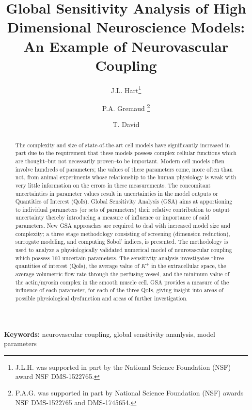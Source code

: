 \documentclass[smallextended]{svjour3}
\numberwithin{equation}{section}
\begin{document}
\title{Global Sensitivity Analysis of High Dimensional Neuroscience Models: An Example of Neurovascular Coupling}
\author{ J.L. Hart\thanks{J.L.H. was supported in part by the National Science Foundation (NSF) award NSF DMS-1522765.} \and P.A. Gremaud  \thanks{P.A.G. was supported in part by National Science Foundation (NSF) awards NSF DMS-1522765 and DMS-1745654.}\and T. David}
\maketitle
\thispagestyle{empty}

\begin{abstract}
The complexity and size of state-of-the-art cell models have significantly increased in part due to  the requirement that these models possess complex cellular functions which are thought--but not necessarily proven--to be important. Modern cell models often involve hundreds of parameters; the values of these parameters come, more often than not, from animal experiments whose relationship to the human physiology is weak with very little information on the errors in these measurements. The concomitant uncertainties in parameter values result in uncertainties in the model outputs or Quantities of Interest (QoIs). Global Sensitivity Analysis (GSA) aims at apportioning to individual parameters (or sets of parameters) their relative contribution to output uncertainty thereby introducing a measure of influence or importance of said parameters. New GSA approaches are required to deal with increased model size and complexity; a three stage methodology consisting of screening (dimension reduction), surrogate modeling, and computing Sobol' indices, is presented. The methodology is used to analyze a physiologically validated numerical model of neurovascular coupling which possess 160 uncertain parameters. The sensitivity analysis investigates three quantities of interest (QoIs), the  average value of $K^+$ in the extracellular space, the average volumetric flow rate through the perfusing vessel, and the minimum value of the actin/myosin complex in the smooth muscle cell. GSA provides a measure of the influence of each parameter, for each of the three QoIs, giving insight into areas of possible physiological dysfunction and areas of further investigation. 

\end{abstract}
\textbf{Keywords:} neurovascular coupling, global sensitivity ananlysis, model parameters\\
\end{document}
